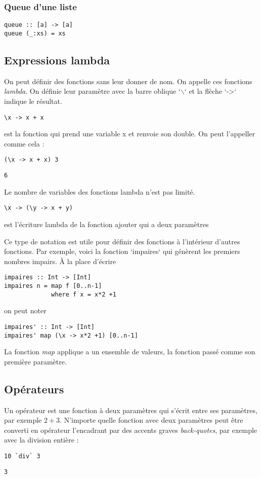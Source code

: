 \documentclass[11pt]{article}
\begin{document}
\subsubsection{Queue d'une liste}
\label{sec:orgca6fef0}
\begin{verbatim}
queue :: [a] -> [a]
queue (_:xs) = xs
\end{verbatim}

\subsection{Expressions lambda}
\label{sec:org1030c4e}

On peut définir des fonctions sans leur donner de nom.  On appelle ces fonctions \emph{lambda}.  On définie leur paramètre avec la barre oblique `$\backslash$` et la flèche `->` indique le résultat.

\begin{verbatim}
\x -> x + x
\end{verbatim}
est la fonction qui prend une variable x et renvoie son double.
On peut l'appeller comme cela :
\begin{verbatim}
(\x -> x + x) 3
\end{verbatim}
\begin{verbatim}
6
\end{verbatim}


Le nombre de variables des fonctions lambda n'est pas limité.

\begin{verbatim}
\x -> (\y -> x + y)
\end{verbatim}
est l'écriture lambda de la fonction ajouter qui a deux paramètres

Ce type de notation est utile pour définir des fonctions à l'intérieur d'autres fonctions.  Par exemple, voici la fonction `impaires` qui génèrent les premiers nombres impairs.     À la place d'écrire
\begin{verbatim}
impaires :: Int -> [Int]
impaires n = map f [0..n-1]
             where f x = x*2 +1
\end{verbatim}
on peut noter
\begin{verbatim}
impaires' :: Int -> [Int]
impaires' map (\x -> x*2 +1) [0..n-1]
\end{verbatim}

La fonction \emph{map}  applique a un ensemble de valeurs, la fonction passé comme son première paramètre.

\subsection{Opérateurs}
\label{sec:org7bae8fa}
Un opérateur est une fonction à deux paramètres qui s'écrit entre ses paramètres, par exemple \(2 + 3\).   N'importe quelle fonction avec deux paramètres peut être converti en opérateur l'encadrant par des accents graves \emph{back-quotes}, par exemple avec la division entière :
\begin{verbatim}
10 `div` 3
\end{verbatim}
\begin{verbatim}
3
\end{verbatim}
\end{document}
